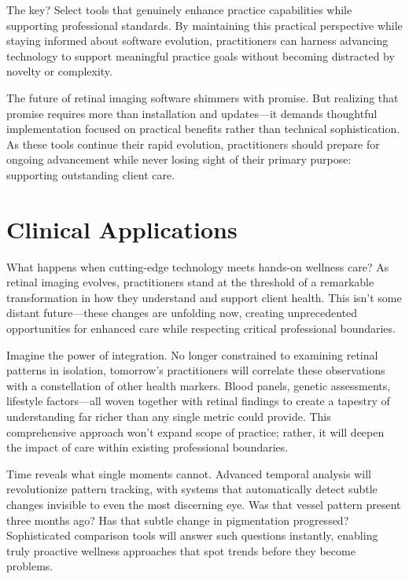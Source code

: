 \documentclass[
  Letterpaper,
]{scrbook}
\begin{document}
The key? Select tools that genuinely enhance practice capabilities while
supporting professional standards. By maintaining this practical
perspective while staying informed about software evolution,
practitioners can harness advancing technology to support meaningful
practice goals without becoming distracted by novelty or complexity.

The future of retinal imaging software shimmers with promise. But
realizing that promise requires more than installation and updates---it
demands thoughtful implementation focused on practical benefits rather
than technical sophistication. As these tools continue their rapid
evolution, practitioners should prepare for ongoing advancement while
never losing sight of their primary purpose: supporting outstanding
client care.

\section{Clinical Applications}\label{clinical-applications}

What happens when cutting-edge technology meets hands-on wellness care?
As retinal imaging evolves, practitioners stand at the threshold of a
remarkable transformation in how they understand and support client
health. This isn't some distant future---these changes are unfolding
now, creating unprecedented opportunities for enhanced care while
respecting critical professional boundaries.

Imagine the power of integration. No longer constrained to examining
retinal patterns in isolation, tomorrow's practitioners will correlate
these observations with a constellation of other health markers. Blood
panels, genetic assessments, lifestyle factors---all woven together with
retinal findings to create a tapestry of understanding far richer than
any single metric could provide. This comprehensive approach won't
expand scope of practice; rather, it will deepen the impact of care
within existing professional boundaries.

Time reveals what single moments cannot. Advanced temporal analysis will
revolutionize pattern tracking, with systems that automatically detect
subtle changes invisible to even the most discerning eye. Was that
vessel pattern present three months ago? Has that subtle change in
pigmentation progressed? Sophisticated comparison tools will answer such
questions instantly, enabling truly proactive wellness approaches that
spot trends before they become problems.
\end{document}
